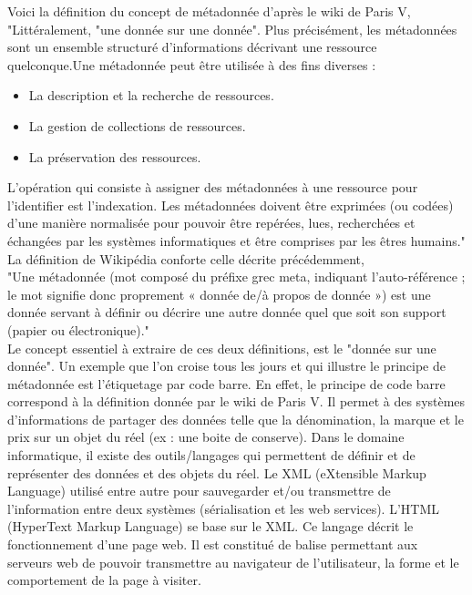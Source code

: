 \documentclass[a4paper,11pt]{report}
\begin{document}
\normalsize{
Voici la définition du concept de métadonnée d'après le wiki de Paris V, \\

"Littéralement, "une donnée sur une donnée". Plus précisément, les métadonnées sont un ensemble structuré d'informations décrivant une ressource quelconque.Une métadonnée peut être utilisée à des fins diverses :
\begin{itemize}
    \item La description et la recherche de ressources.
    \item La gestion de collections de ressources.
    \item La préservation des ressources.
\end{itemize}
L'opération qui consiste à assigner des métadonnées à une ressource pour l'identifier est l'indexation. Les métadonnées doivent être exprimées (ou codées) d'une manière normalisée pour pouvoir être repérées, lues, recherchées et échangées par les systèmes informatiques et être comprises par les êtres humains." \\ 

\normalsize{
La définition de Wikipédia conforte celle décrite précédemment, \\

"Une métadonnée (mot composé du préfixe grec meta, indiquant l'auto-référence ; le mot signifie donc proprement « donnée de/à propos de donnée ») est une donnée servant à définir ou décrire une autre donnée quel que soit son support (papier ou électronique)." \\ 

Le concept essentiel à extraire de ces deux définitions, est le "donnée sur une donnée". Un exemple que l'on croise tous les jours et qui illustre le principe de métadonnée est l'étiquetage par code barre. En effet, le principe de code barre correspond à la définition donnée par le wiki de Paris V. Il permet à des systèmes d'informations de partager des données telle que la dénomination, la marque et le prix  sur un objet du réel (ex : une boite de conserve).
Dans le domaine informatique, il existe des outils/langages qui permettent de définir et de représenter des données et des objets du réel. Le XML (eXtensible Markup Language) utilisé entre autre pour sauvegarder et/ou transmettre de l'information entre deux systèmes (sérialisation et les web services). L'HTML (HyperText Markup Language) se base sur le XML. Ce langage décrit le fonctionnement d'une page web. Il est constitué de balise permettant aux serveurs web de pouvoir transmettre au navigateur de l'utilisateur, la forme et le comportement de la page à visiter.
}

}
\end{document}

